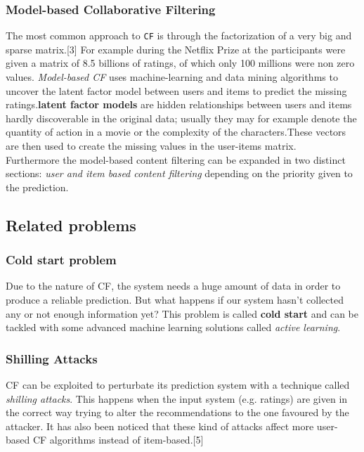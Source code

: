 \documentclass{sig-alternate-05-2015}
\begin{document}
\subsubsection{Model-based Collaborative Filtering}
The most common approach to \texttt{CF} is through the factorization
of a very big and sparse matrix.[3] For example during the Netflix
Prize at the participants were given a matrix of 8.5 billions of ratings,
of which only 100 millions were non zero values.
\textit{Model-based CF} uses machine-learning and data mining algorithms
to uncover the latent factor model between users and items to
predict the missing ratings.\textbf{latent factor models} are hidden
relationships between users and items hardly discoverable in the original data;
usually they may for example denote the quantity of action in a movie or the complexity
of the characters.These vectors are then used to create the missing values in the user-items
matrix.\\


Furthermore the model-based content filtering can be expanded in two distinct sections:
\textit{user and item based content filtering} depending on the priority given to the
prediction.


\subsection{Related problems}
\subsubsection{Cold start problem}
Due to the nature of CF, the system needs a huge amount of data
in order to produce a reliable prediction. But what happens if our system
hasn't collected any or not enough information yet?
This problem is called \textbf{cold start} and can be tackled with some advanced
machine learning solutions called \textit{active learning}.

\subsubsection{Shilling Attacks}
CF can be exploited to perturbate its prediction system with a technique
called \textit{shilling attacks}. This happens when the input system (e.g. ratings)
are given in the correct way trying to alter the recommendations to the one
favoured by the attacker. It has also been noticed that these kind of attacks affect
more user-based CF algorithms instead of item-based.[5]
\end{document}
